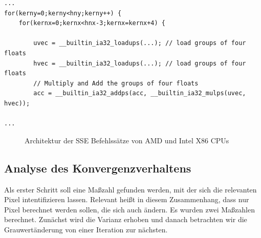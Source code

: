 \documentclass[a4paper,12pt]{article}
\begin{document}
\begin{lstlisting}[float,caption={verwendete x86 build-in
SSE Erweiterungen},label=lst:listData]
...
for(kerny=0;kerny<hny;kerny++) {
	for(kernx=0;kernx<hnx-3;kernx=kernx+4) {
		
		uvec = __builtin_ia32_loadups(...); // load groups of four floats
		hvec = __builtin_ia32_loadups(...); // load groups of four floats
		// Multiply and Add the groups of four floats
		acc = __builtin_ia32_addps(acc, __builtin_ia32_mulps(uvec, hvec));
 
...
\end{lstlisting}
 

\begin{figure}[htbp]
\caption{Architektur der SSE Befehlssätze von AMD und Intel X86 CPUs
\cite{sse_arch}}%
\label{figure_sse_arch}
\end{figure}


\subsection{Analyse des Konvergenzverhaltens}\label{chp:methodik_konvergenz} 

Als erster Schritt soll eine Maßzahl gefunden werden, mit der sich die
relevanten Pixel intentifizieren lassen. Relevant heißt in diesem Zusammenhang, dass nur Pixel
berechnet werden sollen, die sich auch ändern. Es wurden zwei Maßzahlen
berechnet. Zunächst wird die Varianz erhoben und danach betrachten wir die
Grauwertänderung von einer Iteration zur nächsten.
\end{document}
